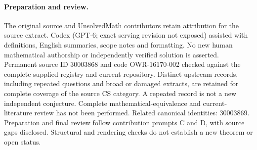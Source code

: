 \documentclass[11pt]{article}
\begin{document}
\paragraph{Preparation and review.}
The original source and UnsolvedMath contributors retain attribution for the source extract. Codex (GPT-6; exact serving revision not exposed) assisted with definitions, English summaries, scope notes and formatting. No new human mathematical authorship or independently verified solution is asserted. Permanent source ID 30003868 and code OWR-16170-002 checked against the complete supplied registry and current repository. Distinct upstream records, including repeated questions and broad or damaged extracts, are retained for complete coverage of the source CS category. A repeated record is not a new independent conjecture. Complete mathematical-equivalence and current-literature review has not been performed. Related canonical identities: 30003869. Preparation and final review follow contribution prompts C and D, with source gaps disclosed. Structural and rendering checks do not establish a new theorem or open status.
\label{end:30003868}
\end{document}
